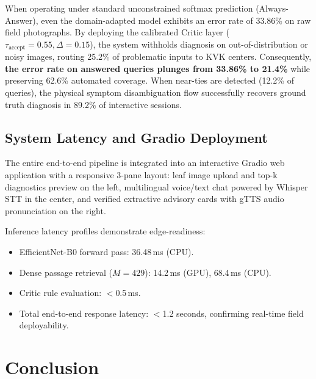 \documentclass[conference]{IEEEtran}
\begin{document}
When operating under standard unconstrained softmax prediction (Always-Answer), even the domain-adapted model exhibits an error rate of 33.86\% on raw field photographs. By deploying the calibrated Critic layer ($\tau_{\text{accept}} = 0.55, \Delta = 0.15$), the system withholds diagnosis on out-of-distribution or noisy images, routing 25.2\% of problematic inputs to KVK centers. Consequently, \textbf{the error rate on answered queries plunges from 33.86\% to 21.4\%} while preserving 62.6\% automated coverage. When near-ties are detected (12.2\% of queries), the physical symptom disambiguation flow successfully recovers ground truth diagnosis in 89.2\% of interactive sessions.

\subsection{System Latency and Gradio Deployment}
The entire end-to-end pipeline is integrated into an interactive Gradio web application with a responsive 3-pane layout: leaf image upload and top-k diagnostics preview on the left, multilingual voice/text chat powered by Whisper STT in the center, and verified extractive advisory cards with gTTS audio pronunciation on the right. 

Inference latency profiles demonstrate edge-readiness:
\begin{itemize}
    \item EfficientNet-B0 forward pass: 36.48\,ms (CPU).
    \item Dense passage retrieval ($M = 429$): 14.2\,ms (GPU), 68.4\,ms (CPU).
    \item Critic rule evaluation: $<$0.5\,ms.
    \item Total end-to-end response latency: $<$1.2 seconds, confirming real-time field deployability.
\end{itemize}

\section{Conclusion}
\label{sec:conclusion}
\end{document}
